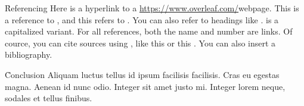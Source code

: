 \documentclass[twocolumn]{paper}
\begin{document}
\h{Referencing}
Here is a hyperlink to a \url{https://www.overleaf.com/}{webpage}. This is a reference to , and this refers to . You can also refer to headings like .  is a capitalized variant. For all references, both the name and number are links. Of cource, you can cite sources using \c{\cite{...}}, like this \cite{minted} or this \cite{tabularray}. You can also insert a bibliography.

\h{Conclusion}
Aliquam luctus tellus id ipsum facilisis facilisis. Cras eu egestas magna. Aenean id nunc odio. Integer sit amet justo mi. Integer lorem neque, sodales et tellus finibus.

\toc

\end{document}
